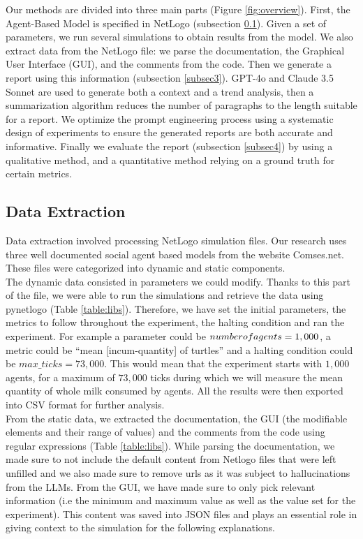 \documentclass[preprint,12pt]{elsarticle}
\begin{document}
Our methods are divided into three main parts (Figure \ref{fig:overview}). First, the Agent-Based Model is specified in NetLogo (subsection \ref{subsec2}). Given a set of parameters, we run several simulations to obtain results from the model. We also extract data from the NetLogo file: we parse the documentation, the Graphical User Interface (GUI), and the comments from the code. Then we generate a report using this information (subsection \ref{subsec3}). GPT-4o and Claude 3.5 Sonnet are used to generate both a context and a trend analysis, then a summarization algorithm reduces the number of paragraphs to the length suitable for a report. We optimize the prompt engineering process using a systematic design of experiments to ensure the generated reports are both accurate and informative. Finally we evaluate the report (subsection \ref{subsec4}) by using a qualitative method, and a quantitative method relying on a ground truth for certain metrics.


\subsection{Data Extraction}
\label{subsec2}


Data extraction involved processing NetLogo simulation files. Our research uses three well documented social agent based models from the website Comses.net. These files were categorized into dynamic and static components.\\

The dynamic data consisted in parameters we could modify. Thanks to this part of the file, we were able to run the simulations and retrieve the data using pynetlogo (Table \ref{table:libs}). Therefore, we have set the initial parameters, the metrics to follow throughout the experiment, the halting condition and ran the experiment. For example a parameter could be $number\-of\-agents = 1,000$, a metric could be “mean [incum-quantity] of turtles” and a halting condition could be $max\_ticks =73,000$. This would mean that the experiment starts with $1,000$ agents, for a maximum of $73,000$ ticks during which we will measure the mean quantity of whole milk consumed by agents. All the results were then exported into CSV format for further analysis.\\

From the static data, we extracted the documentation, the GUI (the modifiable elements and their range of values) and the comments from the code using regular expressions (Table \ref{table:libs}). While parsing the documentation, we made sure to not include the default content from Netlogo files that were left unfilled and we also made sure to remove urls as it was subject to hallucinations from the LLMs. From the GUI, we have made sure to only pick relevant information (i.e the minimum and maximum value as well as the value set for the experiment). This content was saved into JSON files and plays an essential role in giving context to the simulation for the following explanations.
\end{document}
